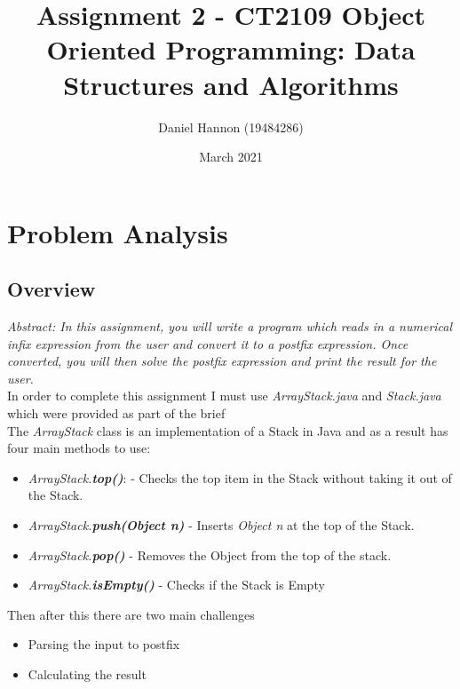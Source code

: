 \documentclass{article}
\title{Assignment 2 - CT2109 Object Oriented Programming: Data Structures and Algorithms}
\author{Daniel Hannon (19484286)}
\date{March 2021}
\begin{document}
	\maketitle
	\section{Problem Analysis}
	\subsection{Overview}
	\textit{Abstract: In this assignment, you will write a program which reads in a numerical infix expression from the user and convert it to a postfix expression. Once converted, you will then solve the postfix expression and print the result for the user.} \\

	In order to complete this assignment I must use \textit{ArrayStack.java} and \textit{Stack.java} which were provided as part of the brief\\
	The \textit{ArrayStack} class is an implementation of a Stack in Java and as a result has four main methods to use:
	\begin{itemize}
		\item \textit{ArrayStack.\textbf{top()}}: - Checks the top item in the Stack without taking it out of the Stack.
		\item \textit{ArrayStack.\textbf{push(Object n)}} - Inserts \textit{Object n} at the top of the Stack.
		\item \textit{ArrayStack.\textbf{pop()}} - Removes the Object from the top of the stack.
		\item \textit{ArrayStack.\textbf{isEmpty()}} - Checks if the Stack is Empty
	\end{itemize}

	Then after this there are two main challenges \\
	\begin{itemize}
		\item Parsing the input to postfix
		\item Calculating the result
	\end{itemize}
\end{document}
